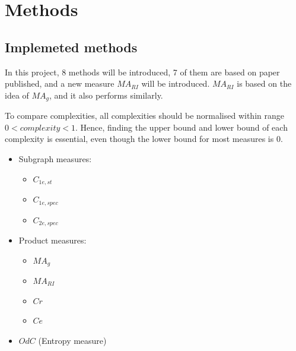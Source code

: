 \documentclass[12pt]{article}
\begin{document}
\section{Methods}
\subsection{Implemeted methods}
In this project, 8 methods will be introduced, 7 of them are based on paper published\cite{KIM20082637}\cite{odc}, and a new measure $MA_{RI}$ will be introduced. $MA_{RI}$ is based on the idea of $MA_g$, and it also performs similarly.\par
To compare complexities, all complexities should be normalised within range $0<complexity<1$. Hence, finding the upper bound and lower bound of each complexity is essential, even though the lower bound for most measures is 0.
\begin{itemize}
    \item Subgraph measures:
    \begin{itemize}
        \item $C_{1e,st}$
        \item $C_{1e,spec}$
        \item $C_{2e,spec}$
    \end{itemize}
    \item Product measures:
    \begin{itemize}
        \item $MA_g$
        \item $MA_{RI}$
        \item $Cr$
        \item $Ce$
    \end{itemize}
    \item $OdC$ (Entropy measure)
\end{itemize}
\end{document}
